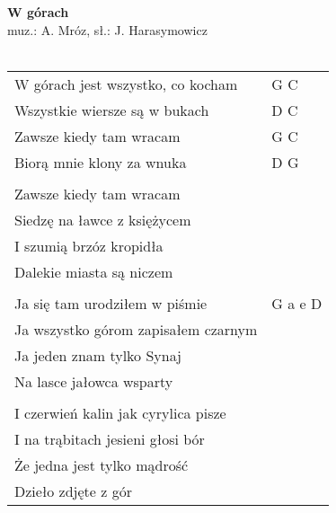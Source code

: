 \documentclass[a5paper]{article}
\begin{document}


\noindent
\fontsize{12pt}{15pt}\selectfont
\textbf{W górach} \\
\fontsize{8pt}{10pt}\selectfont
muz.: A. Mróz, sł.: J. Harasymowicz \\ \\
\fontsize{10pt}{12pt}\selectfont
{}
\begin{tabular}{@{}p{7.50cm}p{3cm}@{}}
\noindent
W górach jest wszystko, co kocham & G C \\
Wszystkie wiersze są w bukach & D C \\
Zawsze kiedy tam wracam & G C \\
Biorą mnie klony za wnuka & D G \\ \\

Zawsze kiedy tam wracam & \\
Siedzę na ławce z księżycem & \\
I szumią brzóz kropidła & \\
Dalekie miasta są niczem & \\ \\

Ja się tam urodziłem w piśmie & G a e D \\
Ja wszystko górom zapisałem czarnym & \\
Ja jeden znam tylko Synaj & \\
Na lasce jałowca wsparty & \\ \\
I czerwień kalin jak cyrylica pisze & \\
I na trąbitach jesieni głosi bór & \\
Że jedna jest tylko mądrość & \\
Dzieło zdjęte z gór &
\end{tabular}
\end{document}
